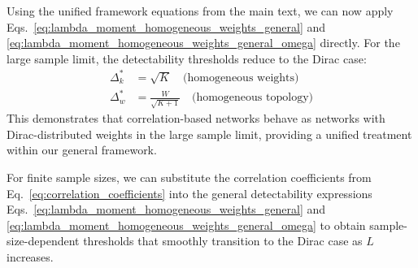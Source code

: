 \documentclass[a4paper,pre,superscriptaddress,floatfix,nofootinbib,twocolumn]{revtex4-1}
\begin{document}
Using the unified framework equations from the main text, we can now apply Eqs.~\eqref{eq:lambda_moment_homogeneous_weights_general} and \eqref{eq:lambda_moment_homogeneous_weights_general_omega} directly. For the large sample limit, the detectability thresholds reduce to the Dirac case:
\begin{align}
    \Delta_k^* &= \sqrt{K} \quad \text{(homogeneous weights)}\\
    \Delta_{w}^* &= \frac{W}{\sqrt{K+1}} \quad \text{(homogeneous topology)}
\end{align}
This demonstrates that correlation-based networks behave as networks with Dirac-distributed weights in the large sample limit, providing a unified treatment within our general framework.

For finite sample sizes, we can substitute the correlation coefficients from Eq.~\eqref{eq:correlation_coefficients} into the general detectability expressions Eqs.~\eqref{eq:lambda_moment_homogeneous_weights_general} and \eqref{eq:lambda_moment_homogeneous_weights_general_omega} to obtain sample-size-dependent thresholds that smoothly transition to the Dirac case as $L$ increases.

%
%
\end{document}
